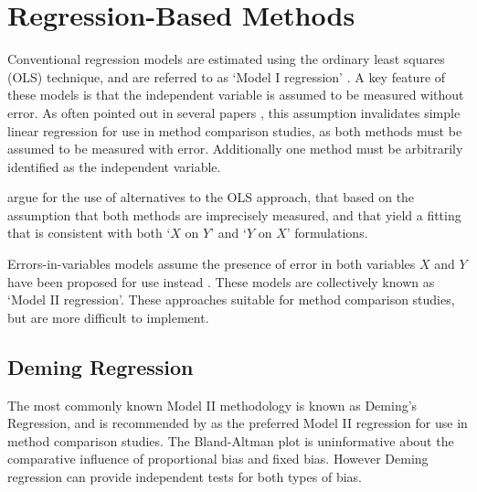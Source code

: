\documentclass[12pt, a4paper]{report}
\theoremstyle{plain}
\theoremstyle{definition}
\theoremstyle{remark}
\begin{document}










\section{Regression-Based Methods}
Conventional regression models are estimated using the ordinary least squares (OLS) technique, and are referred to as `Model I regression' \citep{CornCoch,ludbrook97}. A key feature of these models is that the independent variable is assumed to be measured without error. As often pointed out in several papers \citep{BA83,ludbrook97}, this assumption invalidates simple linear regression for use in method comparison studies, as both methods must be assumed to be measured with error. Additionally one method must be arbitrarily identified as the independent variable.

\citet{CornCoch} argue for the use of alternatives to the OLS approach, that based on the assumption that both methods are imprecisely measured, and that yield a fitting that is consistent with both `$X$ on $Y$' and `$Y$ on $X$' formulations. 

Errors-in-variables models assume the presence of error in both variables $X$ and $Y$ have been proposed for use instead \citep{CornCoch,ludbrook97}. These models are collectively known as `Model II regression'. These approaches suitable for method comparison studies, but are more difficult to implement. 


\subsection{Deming Regression}
The most commonly known Model II methodology is known as Deming's Regression, and is recommended by \citet*{CornCoch} as the preferred Model II regression for use in method comparison studies. The Bland-Altman plot is uninformative about the comparative influence of proportional bias and fixed bias. However Deming regression can provide independent tests for both types of bias.
\end{document}
